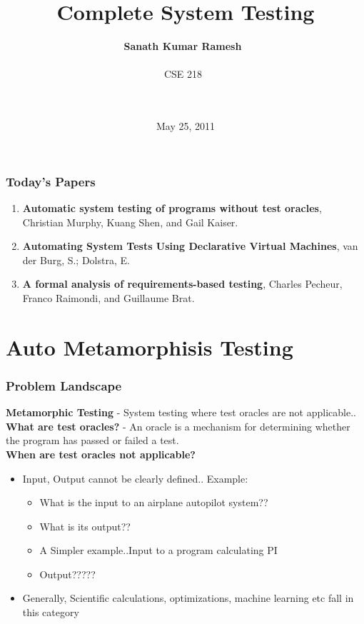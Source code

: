 \documentclass[compress,red]{beamer}
\title{Complete System Testing}
\author[Sanath Kumar Ramesh]
{
	\textbf{Sanath Kumar Ramesh\ \\}
	{\ \\ \small{CSE 218}\ \\ \ \\ \ \\}
}
\date[]{ May 25, 2011}
\begin{document}
\frame{\titlepage}


\frame
{
	\frametitle{Today's Papers}
	\begin{enumerate}
	
	 \item \textbf{Automatic system testing of programs without test oracles}, Christian Murphy, Kuang Shen, and Gail Kaiser.

	\item \textbf{Automating System Tests Using Declarative Virtual Machines}, van der Burg, S.; Dolstra, E.
	
	\item \textbf{A formal analysis of requirements-based testing}, Charles Pecheur, Franco Raimondi, and Guillaume Brat.
	\end{enumerate}
}

\section{Auto Metamorphisis Testing}

\frame
{
	\frametitle{Problem Landscape}
	\pause
	\textbf{Metamorphic Testing} -
	\pause System testing where test oracles are not applicable.. \\	
	\pause \textbf{What are test oracles?} - \pause An oracle is a mechanism for determining whether the program has passed or failed a test. \\
		
	\pause \textbf{When are test oracles not applicable?}
	\pause
	\begin{itemize}
		\item Input, Output cannot be clearly defined.. 
		\pause
		Example:
		\begin{itemize}
			\item What is the input to an airplane autopilot system??
			\pause
			\item What is its output??
			\pause
			\item A Simpler example..\pause Input to a program calculating PI
			\pause
			\item Output????? 
		\end{itemize}
		\pause
		\item Generally, Scientific calculations, optimizations, machine learning etc fall in this category
	\end{itemize}
}
\end{document}
